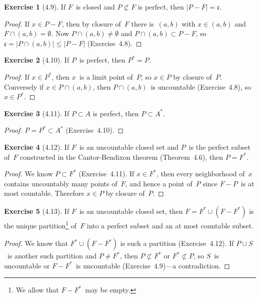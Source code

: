 \documentclass[letterpaper,12pt]{article}
\newcommand{\cc}{\mathfrak{c}}
\newcommand{\union}{\cup}
\newcommand{\sect}{\cap}
\newcommand{\card}[1]{|#1|}
\newcommand{\cond}[1]{#1^*}
\theoremstyle{definition}
\newtheorem*{exer}{Exercise}
\theoremstyle{remark}
\begin{document}
\begin{exer}[4.9]
If \(F\)~is closed and \(P\not\subset F\) is perfect, then \(\card{P-F}=\cc\).
\end{exer}
\begin{proof}
If \(x\in P-F\), then by closure of~\(F\) there is~\((a,b)\) with \(x\in(a,b)\) and \(F\sect(a,b)=\emptyset\). Now \(P\sect(a,b)\ne\emptyset\) and \(P\sect(a,b)\subset P-F\), so \(\cc=\card{P\sect(a,b)}\le\card{P-F}\) (Exercise~4.8).
\end{proof}

\begin{exer}[4.10]
If \(P\)~is perfect, then \(\cond{P}=P\).
\end{exer}
\begin{proof}
If \(x\in\cond{P}\), then \(x\)~is a limit point of~\(P\), so \(x\in P\) by closure of~\(P\). Conversely if \(x\in P\sect(a,b)\), then \(P\sect(a,b)\)~is uncountable (Exercise~4.8), so \(x\in\cond{P}\).
\end{proof}

\begin{exer}[4.11]
If \(P\subset A\) is perfect, then \(P\subset\cond{A}\).
\end{exer}
\begin{proof}
\(P=\cond{P}\subset\cond{A}\) (Exercise~4.10).
\end{proof}

\begin{exer}[4.12]
If \(F\)~is an uncountable closed set and \(P\)~is the perfect subset of~\(F\) constructed in the Cantor-Bendixon theorem (Theorem~4.6), then \(P=\cond{F}\).
\end{exer}
\begin{proof}
We know \(P\subset\cond{F}\) (Exercise~4.11). If \(x\in\cond{F}\), then every neighborhood of~\(x\) contains uncountably many points of~\(F\), and hence a point of~\(P\) since \(F-P\)~is at most countable. Therefore \(x\in P\) by closure of~\(P\).
\end{proof}

\begin{exer}[4.13]
If \(F\)~is an uncountable closed set, then \(F=\cond{F}\union(F-\cond{F})\) is the unique partition\footnote{We allow that \(F-\cond{F}\)~may be empty.} of~\(F\) into a perfect subset and an at most countable subset.
\end{exer}
\begin{proof}
We know that \(\cond{F}\union(F-\cond{F})\) is such a partition (Exercise~4.12). If \(P\union S\)~is another such partition and \(P\ne\cond{F}\), then \(P\not\subset\cond{F}\) or \(\cond{F}\not\subset P\), so \(S\)~is uncountable or \(F-\cond{F}\)~is uncountable (Exercise~4.9)---a contradiction.
\end{proof}
\end{document}

